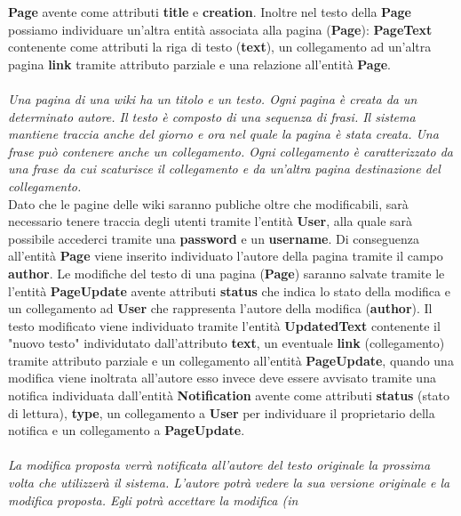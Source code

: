 \documentclass{article}
\begin{document}
{\textbf {Page}} avente come attributi {\textbf {title}} e {\textbf {creation}}. Inoltre nel testo della {\textbf {Page}} possiamo individuare un'altra entità associata alla pagina ({\textbf {Page}): {\textbf {PageText}} contenente come attributi la riga di testo ({\textbf {text}}), un collegamento ad un'altra pagina \textbf {link} tramite attributo parziale e una relazione all'entità \textbf{Page}.\\ \\
	{\itshape Una pagina di una wiki ha un titolo e un testo. Ogni pagina è creata da un determinato autore. Il testo è
		composto di una sequenza di frasi. Il sistema mantiene traccia anche del giorno e ora nel quale la pagina è
		stata creata. Una frase può contenere anche un collegamento. Ogni collegamento è caratterizzato da una
		frase da cui scaturisce il collegamento e da un’altra pagina destinazione del collegamento.}
	\vspace{0.5cm}
	\\
	Dato che le pagine delle wiki saranno publiche oltre che modificabili, sarà necessario tenere traccia degli utenti tramite l'entità {\textbf {User}}, alla quale sarà possibile accederci tramite una {\textbf {password}} e un {\textbf {username}}. Di conseguenza all'entità {\textbf {Page} viene inserito individuato l'autore della pagina tramite il campo {\textbf {author}}. Le modifiche del testo di una pagina ({\textbf {Page}}) saranno salvate tramite le l'entità {\textbf {PageUpdate}} avente attributi {\textbf {status}} che indica lo stato della modifica e un collegamento ad \textbf{User} che rappresenta l'autore della modifica ({\textbf {author}}}). Il testo modificato viene individuato tramite l'entità {\textbf {UpdatedText}} contenente il "nuovo testo" individutato dall'attributo \textbf{text}, un eventuale \textbf{link} (collegamento) tramite attributo parziale e un collegamento all'entità \textbf{PageUpdate}, quando una modifica viene inoltrata all'autore esso invece deve essere avvisato tramite una notifica individuata dall'entità {\textbf {Notification}} avente come attributi {\textbf {status}} (stato di lettura), {\textbf {type}}, un collegamento a {\textbf{User}} per individuare il proprietario della notifica e un collegamento a \textbf{PageUpdate}. \\ \\
	{\itshape La modifica proposta verrà notificata all’autore del testo originale la prossima volta che utilizzerà il sistema.
		L’autore potrà vedere la sua versione originale e la modifica proposta. Egli potrà accettare la modifica (in
}}
\end{document}
